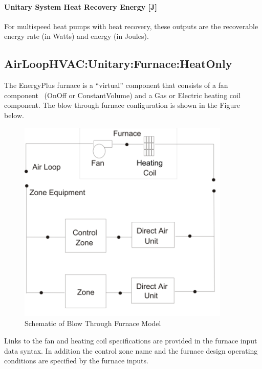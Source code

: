 \paragraph{Unitary System Heat Recovery Energy {[}J{]}}\label{unitary-system-heat-recovery-energy-j-1}

For multispeed heat pumps with heat recovery, these outputs are the recoverable energy rate (in Watts) and energy (in Joules).

\subsection{AirLoopHVAC:Unitary:Furnace:HeatOnly}\label{airloophvacunitaryfurnaceheatonly}

The EnergyPlus furnace is a ``virtual'' component that consists of a fan component~ (OnOff or ConstantVolume) and a Gas or Electric heating coil component. The blow through furnace configuration is shown in the Figure below.

\begin{figure}[hbtp] %
\centering
\includegraphics[width=0.9\textwidth, height=0.9\textheight, keepaspectratio=true]{media/image302.png}
\caption{Schematic of Blow Through Furnace Model \protect \label{fig:schematic-of-blow-through-furnace-model}}
\end{figure}

Links to the fan and heating coil specifications are provided in the furnace input data syntax. In addition the control zone name and the furnace design operating conditions are specified by the furnace inputs.

